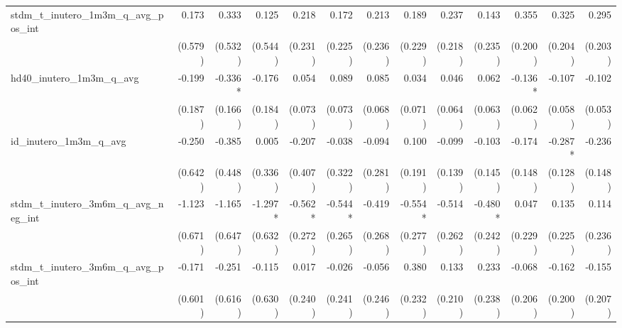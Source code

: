 \begin{tabular}{lrrrrrrrrrrrr}
stdm\_t\_inutero\_1m3m\_q\_avg\_pos\_int    &        0.173 &        0.333 &        0.125 &        0.218 &        0.172 &        0.213 &        0.189 &        0.237 &        0.143 &        0.355 &        0.325 &        0.295 \\ 
                                            &      (0.579) &      (0.532) &      (0.544) &      (0.231) &      (0.225) &      (0.236) &      (0.229) &      (0.218) &      (0.235) &      (0.200) &      (0.204) &      (0.203) \\ 
hd40\_inutero\_1m3m\_q\_avg                 &       -0.199 &      -0.336* &       -0.176 &        0.054 &        0.089 &        0.085 &        0.034 &        0.046 &        0.062 &      -0.136* &       -0.107 &       -0.102 \\ 
                                            &      (0.187) &      (0.166) &      (0.184) &      (0.073) &      (0.073) &      (0.068) &      (0.071) &      (0.064) &      (0.063) &      (0.062) &      (0.058) &      (0.053) \\ 
id\_inutero\_1m3m\_q\_avg                   &       -0.250 &       -0.385 &        0.005 &       -0.207 &       -0.038 &       -0.094 &        0.100 &       -0.099 &       -0.103 &       -0.174 &      -0.287* &       -0.236 \\ 
                                            &      (0.642) &      (0.448) &      (0.336) &      (0.407) &      (0.322) &      (0.281) &      (0.191) &      (0.139) &      (0.145) &      (0.148) &      (0.128) &      (0.148) \\ 
stdm\_t\_inutero\_3m6m\_q\_avg\_neg\_int    &       -1.123 &       -1.165 &      -1.297* &      -0.562* &      -0.544* &       -0.419 &      -0.554* &       -0.514 &      -0.480* &        0.047 &        0.135 &        0.114 \\ 
                                            &      (0.671) &      (0.647) &      (0.632) &      (0.272) &      (0.265) &      (0.268) &      (0.277) &      (0.262) &      (0.242) &      (0.229) &      (0.225) &      (0.236) \\ 
stdm\_t\_inutero\_3m6m\_q\_avg\_pos\_int    &       -0.171 &       -0.251 &       -0.115 &        0.017 &       -0.026 &       -0.056 &        0.380 &        0.133 &        0.233 &       -0.068 &       -0.162 &       -0.155 \\ 
                                            &      (0.601) &      (0.616) &      (0.630) &      (0.240) &      (0.241) &      (0.246) &      (0.232) &      (0.210) &      (0.238) &      (0.206) &      (0.200) &      (0.207) \\ 

\end{tabular}
